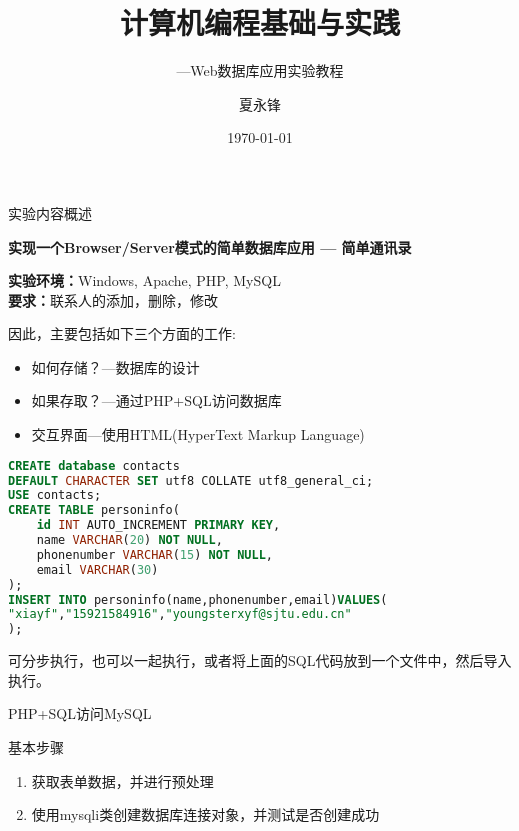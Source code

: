\documentclass[CJK]{beamer}
\begin{document}
\begin{CJK*}{UTF8}{gbsn}
\title{计算机编程基础与实践}
\subtitle{---Web数据库应用实验教程}
\author{夏永锋}
\date{\today}

\begin{frame}
	\titlepage
\end{frame}

\begin{frame}{实验内容概述}
\begin{block}{}
{\bf	实现一个Browser/Server模式的简单数据库应用 --- 简单通讯录}
\end{block}
\begin{block}{}
{\bf 实验环境：}Windows, Apache, PHP, MySQL\\
{\bf 要求：}联系人的添加，删除，修改
\end{block}
因此，主要包括如下三个方面的工作:
\begin{block}{}
	\begin{itemize}
		\item 如何存储？---数据库的设计
		\item 如果存取？---通过PHP+SQL访问数据库
		\item 交互界面---使用HTML(HyperText Markup Language)
	\end{itemize}
\end{block}
\end{frame}
\begin{lstlisting}[language=SQL,caption=创建数据库,keywordstyle=\color{blue!70},frame=shadowbox, rulesepcolor=\color{red!20!green!20!blue!20}]
CREATE database contacts 
DEFAULT CHARACTER SET utf8 COLLATE utf8_general_ci;
USE contacts;
CREATE TABLE personinfo(
	id INT AUTO_INCREMENT PRIMARY KEY,
	name VARCHAR(20) NOT NULL,
	phonenumber VARCHAR(15) NOT NULL,
	email VARCHAR(30)
);
INSERT INTO personinfo(name,phonenumber,email)VALUES(
"xiayf","15921584916","youngsterxyf@sjtu.edu.cn"
);
\end{lstlisting}
\begin{block}{}
可分步执行，也可以一起执行，或者将上面的SQL代码放到一个文件中，然后导入执行。
\end{block}
\begin{frame}{PHP+SQL访问MySQL}
\begin{block}{基本步骤}
\begin{enumerate}
	\item 获取表单数据，并进行预处理
	\item 使用mysqli类创建数据库连接对象，并测试是否创建成功

\end{enumerate}
\end{block}
\end{frame}
\end{CJK*}
\end{document}
